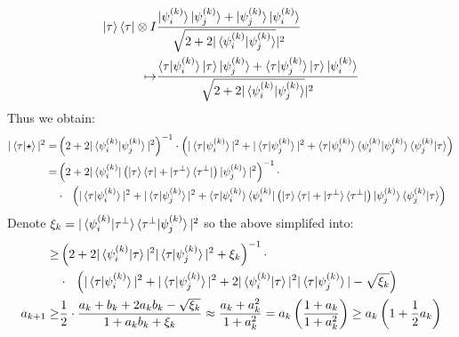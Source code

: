 \documentclass[manuscript,screen,review]{acmart}
\begin{document}
\begin{equation*}
  \begin{split}
    \ket{\tau}\bra{\tau} \otimes I & \frac{
      \ket{\psi^{(k)}_{i}}\ket{\psi^{(k)}_{j}}+\ket{\psi^{(k)}_{j}}\ket{\psi^{(k)}_{i}}
    }{ \sqrt{2 + 2 |\braket{\psi^{(k)}_{i}|\psi^{(k)}_{j}}}|^2 } \\
    \mapsto &  \frac{
      \braket{\tau|\psi^{(k)}_{i}}\ket{\tau}\ket{\psi^{(k)}_{j}}+\braket{\tau|\psi^{(k)}_{j}}\ket{\tau}\ket{\psi^{(k)}_{i}}
    }{ \sqrt{2 + 2 |\braket{\psi^{(k)}_{i}|\psi^{(k)}_{j}}}|^2 }
  \end{split}
\end{equation*}
Thus we obtain:
\begin{equation*}
  \begin{split}
    | \braket{\tau|\star}|^{2}  = & \left(2 + 2
    |\braket{\psi^{(k)}_{i}|\psi^{(k)}_{j}}|^2\right)^{-1} \cdot \left( |
      \braket{\tau|\psi^{(k)}_{i}}|^{2} + | \braket{\tau|\psi^{(k)}_{j}}|^{2}  +
    \braket{\tau|\psi^{(k)}_{i}}\braket{\psi^{(k)}_{i}|\psi^{(k)}_{j}}\braket{\psi^{(k)}_{j}|\tau}\right)
    \\
    = & \left(2 + 2 |\bra{\psi^{(k)}_{i}}\left( \ket{\tau}\bra{\tau}+
        \ket{\tau^{\perp}}\bra{\tau^{\perp}}
    \right)\ket{\psi^{(k)}_{j}}|^2\right)^{-1} \cdot \\
    & \cdot \ \ \left( | \braket{\tau|\psi^{(k)}_{i}}|^{2} + |
      \braket{\tau|\psi^{(k)}_{j}}|^{2}  +
      \braket{\tau|\psi^{(k)}_{i}}\bra{\psi^{(k)}_{i}}\left(
        \ket{\tau}\bra{\tau}+
        \ket{\tau^{\perp}}\bra{\tau^{\perp}}
    \right)\ket{\psi^{(k)}_{j}}\braket{\psi^{(k)}_{j}|\tau}\right) \\
  \end{split}
\end{equation*}
Denote $\xi_{k} =
|\braket{\psi^{(k)}_{i}|\tau^{\perp}}\braket{\tau^{\perp}|\psi^{(k)}_{j}}|^2$
so the above simplifed into:
\begin{equation*}
  \begin{split}
    \ge & \left(2 + 2
      |\braket{\psi^{(k)}_{i}|\tau}|^2|\braket{\tau|\psi^{(k)}_{j}}|^2 +
    \xi_{k}\right)^{-1} \cdot \\
    & \cdot \ \ \left( | \braket{\tau|\psi^{(k)}_{i}}|^{2} + |
      \braket{\tau|\psi^{(k)}_{j}}|^{2}  + 2
      |\braket{\psi^{(k)}_{i}|\tau}|^2|\braket{\tau|\psi^{(k)}_{j}}| -
    \sqrt{\xi_{k}}\right) \\
    a_{k+1} \ge &  \frac{1}{2}\cdot \frac{a_{k}+b_{k}+2a_{k}b_{k} -
    \sqrt{\xi_{k}}}{1 + a_{k}b_{k} + \xi_{k}} \approx \frac{a_{k}+a_{k}^{2}}{1 +
    a_{k}^{2}} = a_{k}\left( \frac{1 + a_{k}}{1 + a_{k}^{2}} \right) \ge
    a_{k}\left( 1 + \frac{1}{2}a_{k} \right)
  \end{split}
\end{equation*}
\end{document}
